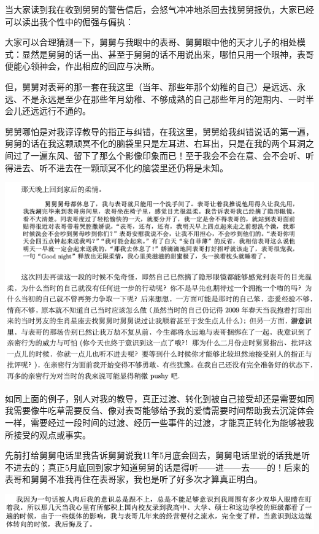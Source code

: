 \documentclass[9pt, b5paper]{article}
\begin{document}
当大家读到我在收到舅舅的警告信后，会怒气冲冲地杀回去找舅舅报仇，大家已经可以读出我个性中的倔强与偏执：

大家可以合理猜测一下，舅舅与我眼中的表哥、舅舅眼中他的天才儿子的相处模式：显然是舅舅的话一出、甚至于舅舅的话不用说出来，哪怕只用一个眼神，表哥便能心领神会，作出相应的回应与决断。

但，舅舅对表哥的那一套在我这里（当年、那些年那个幼稚的自己）是远远、永远、不是永远是至少在那些年月幼稚、不够成熟的自己那些年月的短期内、一时半会儿还远远行不通的。 

舅舅哪怕是对我谆谆教导的指正与纠错，在我这里，舅舅给我纠错说话的第一遍，舅舅的话在我这颗顽冥不化的脑袋里只是左耳进、右耳出，只是在我的两个耳洞之间过了一遍东风、留下了那么个影像印象而已！至于我会不会在意、会不会听、听得进去、听不进去在一颗顽冥不化的脑袋里还仍将是未知。

\begin{center}
\includegraphics[width=.9\linewidth]{./pic/pfp32.png}
\end{center}

如同上面的例子，别人对我的教导，真正过渡、转化到被自己接受却还是需要如同我需要像牛吃草需要反刍、像对表哥能够给予我的爱情需要时间帮助我去沉淀体会一样，需要经过一段时间的过渡、经历一些事件的过渡，才能真正转化为能够被我所接受的观点或事实。

先前打给舅舅电话里我告诉舅舅说我11年5月底会回去，舅舅电话里说的话我是听不进去的；真正5月底回到家才知道舅舅的话是得听——进——去——的！后来的表哥和舅舅不准我再住在表哥家，我也是听了好多次才算真正明白。

\begin{center}
\includegraphics[width=.9\linewidth]{./pic/p1p118-4.png}
\end{center}
\end{document}
